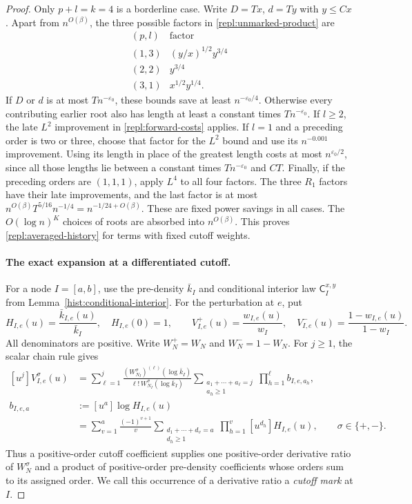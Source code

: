 \begin{proof}
Only $p+l=k=4$ is a borderline case.  Write $D=Tx$, $d=Ty$ with
$y\le Cx$.  Apart from $n^{O(\beta)}$, the three possible factors in
\eqref{repl:unmarked-product} are
\[
 \begin{array}{c|c}
 (p,l)&\text{factor}\\ \hline
 (1,3)&(y/x)^{1/2}y^{3/4}\\
 (2,2)&y^{3/4}\\
 (3,1)&x^{1/2}y^{1/4}.
 \end{array}
\]
If $D$ or $d$ is at most $Tn^{-\varepsilon_0}$, these bounds save at least
$n^{-\varepsilon_0/4}$.  Otherwise every contributing earlier root also
has length at least a constant times $Tn^{-\varepsilon_0}$.  If $l\ge2$,
the late $L^2$ improvement in \eqref{repl:forward-costs} applies.  If
$l=1$ and a preceding order is two or three, choose that factor for the
$L^2$ bound and use its $n^{-0.001}$ improvement.  Using its length in
place of the greatest length costs at most $n^{\varepsilon_0/2}$, since
all those lengths lie between a constant times $Tn^{-\varepsilon_0}$
and $CT$.  Finally, if the preceding orders are $(1,1,1)$, apply
$L^4$ to all four factors.  The three $R_1$ factors have their late
improvements, and the last factor is at most
$n^{O(\beta)}T^{5/16}n^{-1/4}=n^{-1/24+O(\beta)}$.
These are fixed power savings in all cases.  The $O(\log n)^K$ choices of
roots are absorbed into $n^{O(\beta)}$.  This proves
\eqref{repl:averaged-history} for terms with fixed cutoff weights.

\paragraph{The exact expansion at a differentiated cutoff.}
For a node $I=[a,b]$, use the pre-density $\bar k_I$ and conditional
interior law $\mathsf C_I^{x,y}$ from Lemma~\ref{hist:conditional-interior}.
For the perturbation at $e$, put
\[
 H_{I,e}(u)=\frac{\bar k_{I,e}(u)}{\bar k_I},\quad H_{I,e}(0)=1,
 \qquad
 V_{I,e}^+(u)=\frac{w_{I,e}(u)}{w_I},\quad
 V_{I,e}^-(u)=\frac{1-w_{I,e}(u)}{1-w_I}.
\]
All denominators are positive.  Write $W_N^+=W_N$ and $W_N^-=1-W_N$.
For $j\ge1$, the scalar chain rule gives
\begin{equation}\label{repl:cutoff-chain}
\begin{split}
 [u^j]V_{I,e}^{\sigma}(u)
 &=\sum_{\ell=1}^j
 \frac{(W_{N_I}^{\sigma})^{(\ell)}(\log\bar k_I)}
      {\ell!\,W_{N_I}^{\sigma}(\log\bar k_I)}
 \sum_{\substack{a_1+\cdots+a_\ell=j\\a_h\ge1}}
       \prod_{h=1}^{\ell} b_{I,e,a_h},\\
 b_{I,e,a}
 &:=[u^a]\log H_{I,e}(u)\\
 &=\sum_{v=1}^a\frac{(-1)^{v+1}}v
       \sum_{\substack{d_1+\cdots+d_v=a\\d_h\ge1}}
       \prod_{h=1}^{v}[u^{d_h}]H_{I,e}(u),
 \qquad \sigma\in\{+,-\}.
\end{split}
\end{equation}
Thus a positive-order cutoff coefficient supplies one positive-order
derivative ratio of $W_N^\sigma$ and a product of positive-order pre-density
coefficients whose orders sum to its assigned order.  We call this occurrence
of a derivative ratio a \emph{cutoff mark} at $I$.


\end{proof}
